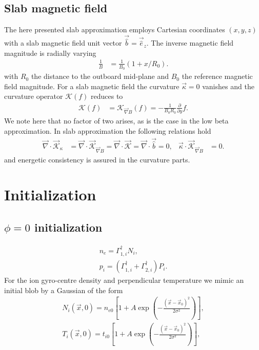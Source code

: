 \subsection{Slab magnetic field}\label{sec:slabapprox}
The here presented slab approximation employs Cartesian coordinates \((x,y,z)\) with a slab magnetic field unit vector \(\vec{\hat{b}} = \vec{\hat{e}}_z\). The inverse magnetic field magnitude is 
radially varying 
\begin{align}
 \frac{1}{B}&= \frac{1}{B_0} \left( 1+x/R_0\right) .
\end{align}
with \(R_0\) the distance to the outboard mid-plane and \(B_0\) the reference magnetic field magnitude. 
For a slab magnetic field the curvature \(\vec{\kappa} = 0\) vanishes and the curvature operator \(\mathcal{K} (f)\) reduces to
\begin{align}
  \mathcal{K} (f) &=\mathcal{K}_{\vec{\nabla}  B} (f) =-\frac{1}{B_0 R_0 } \frac{\partial }{\partial y }f.
\end{align}
We note here that no factor of two arises, as is the case in the low beta approximation. In slab approximation the following relations hold
\begin{align}
   \vec{\nabla} \cdot  \vec{\mathcal{K}}_{\kappa} &=   \vec{\nabla} \cdot \vec{\mathcal{K}}_{\vec{\nabla}  B} =  \vec{\nabla} \cdot \vec{ \mathcal{K}} =   \vec{\nabla} \cdot \vec{\hat{b}} =  0,     
    &  \vec{\kappa} \cdot \vec{\mathcal{K}}_{\vec{\nabla}  B} &= 0.
\end{align}
and energetic consistency is assured in the curvature parts.
\section{Initialization}
\subsection{\(\phi=0\) initialization}
\begin{align}
  n_e  =\Gamma_{1,i}^\dagger N_i, \\ 
 p_{i} = \left(\Gamma_{1,i}^{\dagger} + \Gamma_{2,i}^{\dagger} \right)P_{i} .
\end{align}
For the ion gyro-centre density and perpendicular temperature we mimic an initial blob by a Gaussian of the form
\begin{eqnarray}
 N_{i}\left(\vec{x},0\right) =   n_{e0}\left[1+A \exp{\left(-\frac{\left(\vec{x}-\vec{x}_0\right)^2}{2\sigma^2}\right)}\right],  \\
 T_{i}\left(\vec{x},0\right) =   t_{i0}\left[1+A \exp{\left(-\frac{\left(\vec{x}-\vec{x}_0\right)^2}{2\sigma^2}\right)} \right],
\end{eqnarray}
